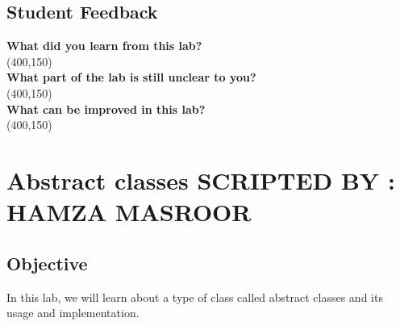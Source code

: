 \documentclass[11pt,fleqn]{book} %
\begin{document}
 \newpage
 \section{Student Feedback}
 \textbf{What did you learn from this lab?}\\ 
 \framebox(400,150){}\\
 \textbf{What part of the lab is still unclear to you?}\\
 \framebox(400,150){}\\
 \textbf{What can be improved in this lab?}\\ 
 \framebox(400,150){}\\

\newpage

\chapter{Abstract classes \hspace{44mm} {\textsc{\small SCRIPTED BY : HAMZA MASROOR}}}
\section{Objective}
In this lab, we will learn about a type of class called abstract classes and its usage and implementation.
\end{document}
